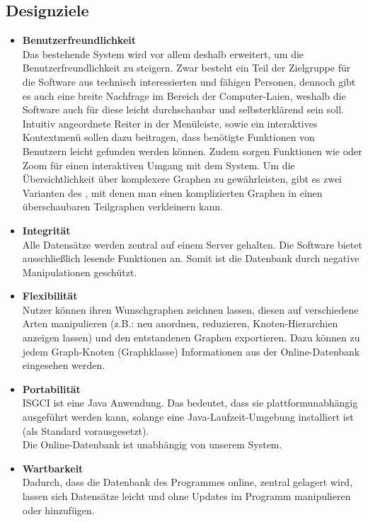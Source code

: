 \documentclass[10pt,a4paper]{article}
\newcommand{\G}[1]{\glqq\text{#1}\grqq} %
\begin{document}
\subsection{Designziele}
\begin{itemize}	
		\item \textbf{Benutzerfreundlichkeit}\\
		Das bestehende System wird vor allem deshalb erweitert, um die Benutzerfreundlichkeit zu steigern. Zwar besteht ein Teil der Zielgruppe für die Software aus technisch interessierten und fähigen Personen, dennoch gibt es auch eine breite Nachfrage im Bereich der Computer-Laien, weshalb die Software auch für diese leicht durchschaubar und selbsterklärend sein soll. Intuitiv angeordnete Reiter in der Menüleiste, sowie ein interaktives Kontextmenü sollen dazu beitragen, dass benötigte Funktionen von Benutzern leicht gefunden werden können. Zudem sorgen Funktionen wie \G{Grab\&Pull} oder Zoom für einen interaktiven Umgang mit dem System. Um die Übersichtlichkeit über komplexere Graphen zu gewährleisten, gibt es zwei Varianten des \G{Expanding/Collapsing}, mit denen man einen komplizierten Graphen in einen überschaubaren Teilgraphen verkleinern kann.
		\item \textbf{Integrität}\\
		Alle Datensätze werden zentral auf einem Server gehalten. Die Software bietet ausschließlich lesende Funktionen an. Somit ist die Datenbank durch negative Manipulationen geschützt.
		\item \textbf{Flexibilität}\\
		Nutzer können ihren Wunschgraphen zeichnen lassen, diesen auf verschiedene Arten manipulieren (z.B.: neu anordnen, reduzieren, Knoten-Hierarchien anzeigen lassen) und den entstandenen Graphen exportieren. Dazu können zu jedem Graph-Knoten (Graphklasse) Informationen aus der Online-Datenbank eingesehen werden.  
		\item \textbf{Portabilität}\\
		ISGCI ist eine Java Anwendung. Das bedeutet, dass sie plattformunabhängig ausgeführt werden kann, solange eine Java-Laufzeit-Umgebung installiert ist (als Standard vorausgesetzt).\\
		Die Online-Datenbank ist unabhängig von unserem System. 
		\item \textbf{Wartbarkeit}\\
		Dadurch, dass die Datenbank des Programmes online, zentral gelagert wird, lassen sich Datensätze leicht und ohne Updates im Programm manipulieren oder hinzufügen.
		\end{itemize}
\end{document}
